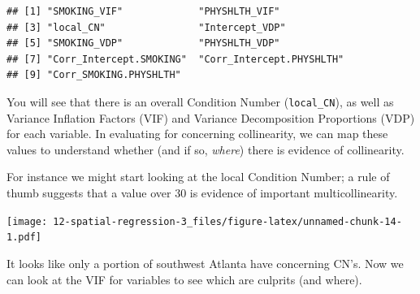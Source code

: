 \documentclass[
]{book}
\newenvironment{Shaded}{\begin{snugshade}}{\end{snugshade}}
\newcommand{\AttributeTok}[1]{\textcolor[rgb]{0.13,0.29,0.53}{#1}}
\newcommand{\DecValTok}[1]{\textcolor[rgb]{0.00,0.00,0.81}{#1}}
\newcommand{\FloatTok}[1]{\textcolor[rgb]{0.00,0.00,0.81}{#1}}
\newcommand{\FunctionTok}[1]{\textcolor[rgb]{0.13,0.29,0.53}{\textbf{#1}}}
\newcommand{\NormalTok}[1]{#1}
\newcommand{\SpecialCharTok}[1]{\textcolor[rgb]{0.81,0.36,0.00}{\textbf{#1}}}
\newcommand{\StringTok}[1]{\textcolor[rgb]{0.31,0.60,0.02}{#1}}
\begin{document}
\begin{verbatim}
## [1] "SMOKING_VIF"             "PHYSHLTH_VIF"           
## [3] "local_CN"                "Intercept_VDP"          
## [5] "SMOKING_VDP"             "PHYSHLTH_VDP"           
## [7] "Corr_Intercept.SMOKING"  "Corr_Intercept.PHYSHLTH"
## [9] "Corr_SMOKING.PHYSHLTH"
\end{verbatim}

You will see that there is an overall Condition Number (\texttt{local\_CN}), as well as Variance Inflation Factors (VIF) and Variance Decomposition Proportions (VDP) for each variable. In evaluating for concerning collinearity, we can map these values to understand whether (and if so, \emph{where}) there is evidence of collinearity.

For instance we might start looking at the local Condition Number; a rule of thumb suggests that a value over 30 is evidence of important multicollinearity.

\begin{Shaded}
\end{Shaded}

\texttt{[image: 12-spatial-regression-3\_files/figure-latex/unnamed-chunk-14-1.pdf]}

It looks like only a portion of southwest Atlanta have concerning CN's. Now we can look at the VIF for variables to see which are culprits (and where).

\begin{Shaded}
\end{Shaded}
\end{document}
